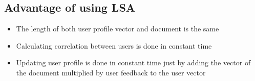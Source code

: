 \subsection{Advantage of using LSA}
\begin{itemize}
\item  The length of both user profile vector and document is the same
\item  Calculating correlation between users is done in constant time
\item  Updating user profile is done in constant time just by adding the vector of the document multiplied by user feedback to the user vector
\end{itemize}




